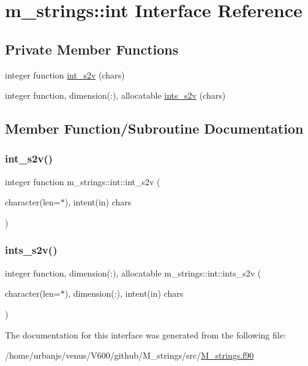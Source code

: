 \hypertarget{interfacem__strings_1_1int}{}\section{m\+\_\+strings\+:\+:int Interface Reference}
\label{interfacem__strings_1_1int}
\subsection*{Private Member Functions}
\begin{DoxyCompactItemize}
\item 
integer function \mbox{\hyperlink{interfacem__strings_1_1int_a8c705dff02fddea29838d86d2518d74f}{int\+\_\+s2v}} (chars)
\item 
integer function, dimension(\+:), allocatable \mbox{\hyperlink{interfacem__strings_1_1int_a402d59ca538c14472c4885a1897877a4}{ints\+\_\+s2v}} (chars)
\end{DoxyCompactItemize}


\subsection{Member Function/\+Subroutine Documentation}
\mbox{\label{interfacem__strings_1_1int_a8c705dff02fddea29838d86d2518d74f}} 
\subsubsection{\texorpdfstring{int\+\_\+s2v()}{int\_s2v()}}
{\footnotesize\ttfamily integer function m\+\_\+strings\+::int\+::int\+\_\+s2v (\begin{DoxyParamCaption}\item[{character(len=$\ast$), intent(in)}]{chars }\end{DoxyParamCaption})\hspace{0.3cm}{\ttfamily [private]}}

\mbox{\label{interfacem__strings_1_1int_a402d59ca538c14472c4885a1897877a4}} 
\subsubsection{\texorpdfstring{ints\+\_\+s2v()}{ints\_s2v()}}
{\footnotesize\ttfamily integer function, dimension(\+:), allocatable m\+\_\+strings\+::int\+::ints\+\_\+s2v (\begin{DoxyParamCaption}\item[{character(len=$\ast$), dimension(\+:), intent(in)}]{chars }\end{DoxyParamCaption})\hspace{0.3cm}{\ttfamily [private]}}



The documentation for this interface was generated from the following file\+:\begin{DoxyCompactItemize}
\item 
/home/urbanjs/venus/\+V600/github/\+M\+\_\+strings/src/\mbox{\hyperlink{M__strings_8f90}{M\+\_\+strings.\+f90}}\end{DoxyCompactItemize}
